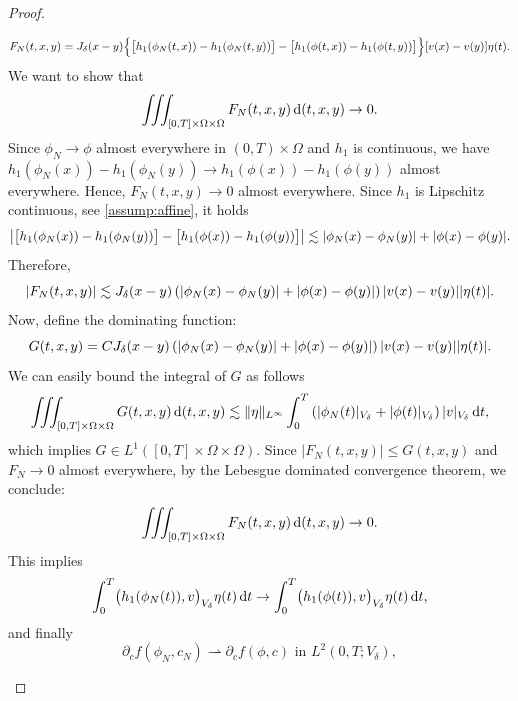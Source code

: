 \documentclass[]{article}
\newcommand{\dt}{\,\textup{d}t}
\DeclarePairedDelimiter{\abs}{\lvert}{\rvert}
\begin{document}
\begin{proof}
\begin{itemize}
		\[
		F_N(t, x, y) = J_\delta(x-y) \Bigl\{ \bigl[h_1(\phi_N(t,x)) - h_1(\phi_N(t,y))\bigr] - \bigl[h_1(\phi(t,x)) - h_1(\phi(t,y))\bigr] \Bigr\} [v(x) - v(y)] \eta(t).
		\]
		We want to show that
		\[
		\iiint_{[0,T] \times \Omega \times \Omega} F_N(t, x, y)  \,\textup{d}(t,x,y) \to 0.
		\]
		Since \(\phi_N \to \phi\) almost everywhere in \((0,T) \times \Omega\) and \(h_1\) is continuous, we have
		$h_1(\phi_N(x)) - h_1(\phi_N(y)) \to h_1(\phi(x)) - h_1(\phi(y))$ almost everywhere.
		Hence, \(F_N(t, x, y) \to 0\) almost everywhere.
		Since \(h_1\) is Lipschitz continuous, see \eqref{assump:affine}, it holds
		\[
		\left| \bigl[h_1(\phi_N(x)) - h_1(\phi_N(y))\bigr] - \bigl[h_1(\phi(x)) - h_1(\phi(y))\bigr] \right| \lesssim \abs{\phi_N(x) - \phi_N(y)} + \abs{\phi(x) - \phi(y)}.
		\]
		Therefore,
		\[
		\abs{F_N(t, x, y)} \lesssim J_\delta(x-y) \left( \abs{\phi_N(x) - \phi_N(y)} + \abs{\phi(x) - \phi(y)} \right) \abs{v(x) - v(y)} \abs{\eta(t)}.
		\]
		Now, define the dominating function:
		\[
		G(t, x, y) = C J_\delta(x-y) \left( \abs{\phi_N(x) - \phi_N(y)} + \abs{\phi(x) - \phi(y)} \right) \abs{v(x) - v(y)} \abs{\eta(t)}.
		\]
		We can easily bound the integral of $G$ as follows
		\[
		\iiint_{[0,T] \times \Omega \times \Omega}  G(t, x, y)  \,\textup{d}(t,x,y) \lesssim \|\eta\|_{L^\infty} \int_0^T \left( \abs{\phi_N(t)}_{V_\delta} + \abs{\phi(t)}_{V_\delta} \right) \abs{v}_{V_\delta}  \dt,
		\]
		which implies \(G \in L^1([0,T] \times \Omega \times \Omega)\).
		Since \(|F_N(t, x, y)| \leq G(t, x, y)\) and \(F_N \to 0\) almost everywhere, by the Lebesgue dominated convergence theorem, we conclude:
		\[
		\iiint_{[0,T] \times \Omega \times \Omega} F_N(t, x, y)  \,\textup{d}(t,x,y) \to 0.
		\]
		This implies
		\[
		\int_0^T \bigl(h_1(\phi_N(t)), v\bigr)_{V_\delta} \eta(t)  \dt \to \int_0^T \bigl(h_1(\phi(t)), v\bigr)_{V_\delta} \eta(t)  \dt,
		\]
		and finally
		$$\partial_c f(\phi_N,c_N) \rightharpoonup \partial_c f(\phi,c) \text{ in } L^2(0,T;V_\delta),$$
		

\end{itemize}
\end{proof}
\end{document}

